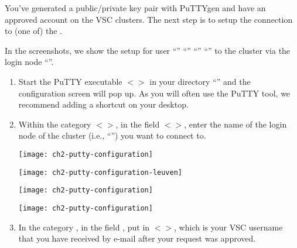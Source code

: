   You've generated a public/private key pair with PuTTYgen and have an approved
  account on the VSC clusters.  The next step is to setup the connection to (one
  of) the \hpc.

   In the screenshots, we show the setup for user
\ifantwerpen
``''
\fi
\ifbrussel
``''
\fi
\ifgent
``''
\fi
\ifleuven
``''
\fi
  to the \hpc cluster via the login node
  ``\strong{\emph{\loginnode}}''.

  \begin{enumerate}
    \item  Start the PuTTY executable $<$$>$ in your
      directory ``'' and the
      configuration screen will pop up. As you will often use the PuTTY tool,
      we recommend adding a shortcut on your desktop.
    \item  Within the category $<$$>$, in the field
      $<$$>$, enter the name of the login node of the
      \hpc cluster (i.e., ``\strong{\emph{\loginnode}}'')
      you want to connect to.

\ifantwerpen
      \begin{center}
      \texttt{[image: ch2-putty-configuration]}
      \end{center}
\fi
\ifleuven
      \begin{center}
      \texttt{[image: ch2-putty-configuration-leuven]}
      \end{center}
\fi
\ifbrussel
      \begin{center}
      \texttt{[image: ch2-putty-configuration]}
      \end{center}
\fi
\ifgent
      \begin{center}
      \texttt{[image: ch2-putty-configuration]}
      \end{center}
\fi

    \item  In the category , in
      the field , put in
      $<$\emph{\userid}$>$, which is your VSC username that you have
      received by e-mail after your request was approved.


\end{enumerate}
